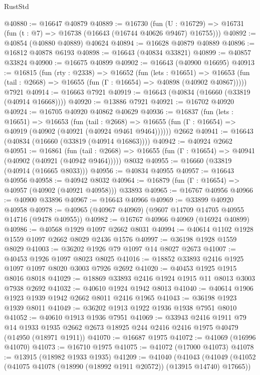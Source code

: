\begin{lexlean}{RustStd}
\begin{coremodule}
@40880 := @16647 @40879
@40889 := @16730
    (fun (U : @16729) => @16731 (fun (t : @7) => @16738 (@16643 (@16744 @40626 @9467) @16755)))
@40892 := @40854 (@40880 @40889) @40624
@40894 := @16628 @40879 @40889
@40896 := @16812 @40878 @6193
@40898 := @16643 (@40834 @33821)
@40899 := @40857 @33824
@40900 := @16675 @40899
@40902 := @16643 (@40900 @16695)
@40913 := @16815
    (fun (rty : @2338) =>
    @16652
      (fun (lets : @16651) =>
      @16653 (fun (tail : @2668) => @16655 (fun (Γ : @16654) => @40898 (@40902 @40867)))))
    @7921
@40914 := @16663 @7921
@40919 := @16643 (@40834 (@16660 (@33819 (@40914 @16668))))
@40920 := @13886 @7921
@40921 := @16702 @40920
@40924 := @16705 @40920 @40862 @40629
@40936 := @16837
    (fun (lets : @16651) =>
    @16653
      (fun (tail : @2668) =>
      @16655 (fun (Γ : @16654) => @40919 (@40902 (@40921 (@40924 @9461 @9464))))))
    @2662
@40941 := @16643 (@40834 (@16660 (@33819 (@40914 @16863))))
@40942 := @40924 @2662
@40951 := @16861
    (fun (tail : @2668) => @16655 (fun (Γ : @16654) => @40941 (@40902 (@40921 (@40942 @9464)))))
    @8032
@40955 := @16660 (@33819 (@40914 (@16665 @8033)))
@40956 := @40834 @40955
@40957 := @16643 @40956
@40958 := @40942 @8032
@40964 := @16879 (fun (Γ : @16654) => @40957 (@40902 (@40921 @40958))) @33893
@40965 := @16767 @40956
@40966 := @40900 @33896
@40967 := @16643 @40966
@40969 := @33899 @40920 @40958
@40978 := @40965 (@40967 @40969) (@9607 @14709 @14705 @40955 @14716 (@9478 @40955))
@40982 := @16767 @40966 @40969 (@16924 @40899)
@40986 := @40568 @1929 @1097 @2662 @8031
@40994 := @40614 @1102 @1928 @1559 @1097 @2662 @8029 @2436 @1576
@40997 := @36198 @1928 @1559 @8029
@41003 := @36202 @1926 @79 @1097 @14 @8027 @2673
@41007 := @40453 @1926 @1097 @8023 @8025
@41016 := @18852 @33893 @2416 @1925 @1097 @1097 @8020 @3003 @7926 @2692
@41020 := @40453 @1925 @1915 @8016 @8018
@41029 := @18869 @33893 @2416 @1924 @1915 @11 @8013 @3003 @7938 @2692
@41032 := @40610 @1924 @1942 @8013
@41040 := @40614 @1906 @1923 @1939 @1942 @2662 @8011 @2416 @1965
@41043 := @36198 @1923 @1939 @8011
@41049 := @36202 @1913 @1922 @1936 @1938 @7951 @8010
@41052 := @40610 @1913 @1936 @7951
@41069 := @33943
    @2416
    @1911
    @79
    @14
    @1933
    @1935
    @2662
    @2673
    @18925
    @244
    @2416
    @2416
    @1975
    @40479
    (@14950 (@18971 @1911))
@41070 := @16687 @1975
@41072 := @41069 (@16996 @41070)
@41073 := @16710 @1975
@41075 := @41072 (@17000 @41073)
@41078 := @13915 (@18982 @1933 @1935)
@41209 := @41040
    (@41043
      (@41049
        (@41052 (@41075 @41078 (@18990 (@18992 @1911 @20572)) (@13915 @14740) @17665))

\end{coremodule}
\end{lexlean}
